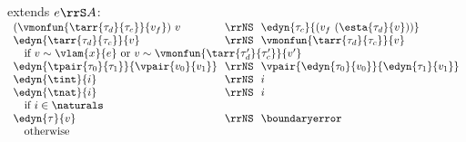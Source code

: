 \begin{flushleft}
\begin{minipage}[t]{\columnwidth}
 extends $e \rrS A$:\\
$\begin{array}{l@{~~}c@{~~}l}
  (\vmonfun{\tarr{\tau_d}{\tau_c}}{v_f})~v & \rrNS & \edyn{\tau_c}{(v_f~(\esta{\tau_d}{v}))}
\\
  \edyn{\tarr{\tau_d}{\tau_c}}{v} & \rrNS & \vmonfun{\tarr{\tau_d}{\tau_c}}{v}
\\ \multicolumn{3}{l}{\mbox{\quad if $v \sim \vlam{x}{e}$ or $v \sim \vmonfun{\tarr{\tau_d'}{\tau_c'}}{v'}$}}
\\
  \edyn{\tpair{\tau_0}{\tau_1}}{\vpair{v_0}{v_1}} & \rrNS & \vpair{\edyn{\tau_0}{v_0}}{\edyn{\tau_1}{v_1}}
\\
  \edyn{\tint}{i} & \rrNS & i
\\
  \edyn{\tnat}{i} & \rrNS & i
\\ \multicolumn{3}{l}{\mbox{\quad if $i \in \naturals$}}
\\
  \edyn{\tau}{v} & \rrNS & \boundaryerror
\\ \multicolumn{3}{l}{\mbox{\quad otherwise}}
\end{array}$
\end{minipage}

\end{flushleft}
